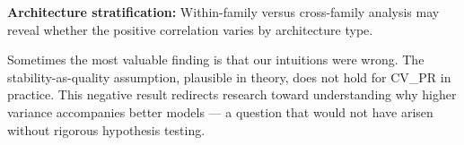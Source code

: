 \textbf{Architecture stratification:} Within-family versus cross-family analysis may reveal whether the positive correlation varies by architecture type.

Sometimes the most valuable finding is that our intuitions were wrong. The stability-as-quality assumption, plausible in theory, does not hold for CV\_PR in practice. This negative result redirects research toward understanding why higher variance accompanies better models --- a question that would not have arisen without rigorous hypothesis testing.
